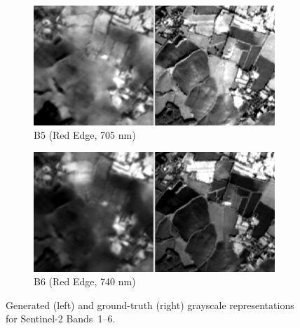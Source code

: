 \begin{figure}[h!]
    \vspace{0.5em}
    \begin{subfigure}{0.48\textwidth}
        \centering
        \includegraphics[width=\linewidth]{img/bands_gray/sample_000008_B05_panel.png}
        \caption{B5 (Red Edge, 705 nm)}
    \end{subfigure}\hfill
    \begin{subfigure}{0.48\textwidth}
        \centering
        \includegraphics[width=\linewidth]{img/bands_gray/sample_000008_B06_panel.png}
        \caption{B6 (Red Edge, 740 nm)}
    \end{subfigure}

    \caption[Bandwise grayscale reconstructions (Bands 1–6)]%
    {Generated (left) and ground-truth (right) grayscale representations for Sentinel-2 Bands~1–6.}
    \label{fig:appendix_band_panels}
\end{figure}

